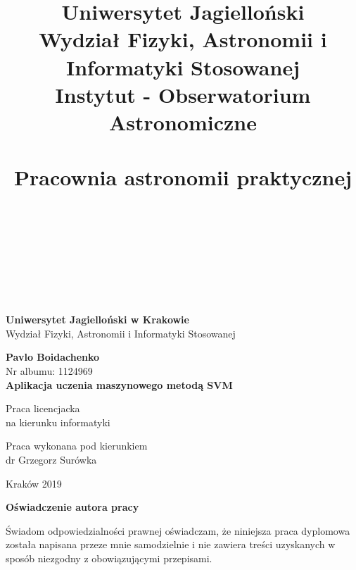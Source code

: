 \documentclass[paper=a4, fontsize=11pt]{scrartcl} %
\title{	
\normalfont \normalsize 
Uniwersytet Jagielloński\\Wydział Fizyki, Astronomii i Informatyki Stosowanej\\Instytut - Obserwatorium Astronomiczne \\ [20pt] %
\horrule{0.5pt} \\[0.4cm] %
\Large Pracownia astronomii praktycznej \\  \nazwa \\
\horrule{2pt} \\[0.5cm] %
}
\author{\autor\\} %
\date{\data} %
\numberwithin{equation}{section} %
\numberwithin{figure}{section} %
\begin{document}
\thispagestyle{empty}
\begin{titlepage}
    \begin{center}

           \Large
	\textbf{Uniwersytet Jagielloński w Krakowie}\vspace{0.2cm}\\ Wydział Fizyki, Astronomii i Informatyki Stosowanej
               \vspace*{1cm}
               
         \vspace{3cm}
         \Large
          \textbf{Pavlo Boidachenko}\\\vspace{0.5cm}
         \normalsize Nr albumu: 1124969\\
             \vspace{2cm}
        \Huge
        \textbf{Aplikacja uczenia maszynowego metodą SVM}
      
        \vspace{1.5cm}
        \normalsize
        Praca licencjacka\\
        na kierunku informatyki\\ \vspace{0.15cm}
        
        \vfill
        \vspace{2cm}
       \begin{minipage}{1\textwidth}
\begin{flushright}
Praca wykonana pod kierunkiem\\
dr Grzegorz Surówka\\
\end{flushright}
\end{minipage}
        
        \vspace{2cm}
        \begin{center}
      Kraków 2019
        \end{center}
    \end{center}
\end{titlepage}

\newpage 
 \thispagestyle{empty}
\vspace{2.5cm}
\begin{flushleft}
\large \textbf{Oświadczenie autora pracy}\vspace{0.6cm}\\
\end{flushleft}

\noindent Świadom odpowiedzialności prawnej oświadczam, że niniejsza praca dyplomowa została napisana przeze mnie samodzielnie i nie zawiera treści uzyskanych w sposób niezgodny z obowiązującymi przepisami.\\
\end{document}
